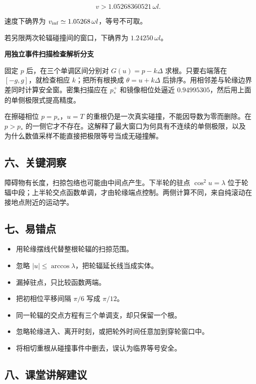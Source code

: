 \documentclass[12pt,a4paper,UTF8]{ctexart}
\newcommand{\tightlist}{\setlength{\itemsep}{0pt}\setlength{\parskip}{0pt}}
\begin{document}
\[\boxed{v>1.05268360521\,\omega l}.\]

速度下确界为 \(v_{\rm inf}\simeq1.05268\,\omega l\)，等号不可取。

若另限两次轮辐碰撞间的窗口，下确界为 \(1.24250\,\omega l\)。

\textbf{用独立事件扫描检查解析分支}

固定 \(p\) 后，在三个单调区间分别对 \(G(u)=p-k\Delta\)
求根。只要右端落在 \([-g,g]\)，就检查相应 \(k\)；把所有根换成
\(\theta=u+k\Delta\)
后排序。用相邻差与轮缘边界差同时计算安全窗。密集扫描应在 \(p_*^+\)
和镜像相位处逼近 \(0.94995305\)，然后用上面的单侧极限式提高精度。

在擦碰相位 \(p=p_*\)，\(u=T\)
的重根仍是一次真实碰撞，不能因导数为零而删除。在 \(p>p_*\)
的一侧它才不存在。这解释了最大窗口为何具有不连续的单侧极限，以及为什么数值采样不能直接把极限等号当成无碰撞解。

\subsection{六、关键洞察}\label{ux516dux5173ux952eux6d1eux5bdf}

障碍物有长度，扫掠包络也可能由中间点产生。下半轮的驻点
\(\cos^2u=\lambda\)
位于轮辐中段；上半轮交点函数单调，才由轮缘端点控制。两侧计算不同，来自纯滚动在接地点附近的运动学。

\subsection{七、易错点}\label{ux4e03ux6613ux9519ux70b9}

\begin{itemize}
\tightlist
\item
  用轮缘摆线代替整根轮辐的扫掠范围。
\item
  忽略 \(|u|\le\arccos\lambda\)，把轮辐延长线当成实体。
\item
  漏掉驻点，只比较函数两端。
\item
  把初相位平移间隔 \(\pi/6\) 写成 \(\pi/12\)。
\item
  同一轮辐的交点方程有三个单调支，却只保留一个根。
\item
  忽略轮缘进入、离开时刻，或把轮外时间任意加到穿轮窗口中。
\item
  将相切重根从碰撞事件中删去，误认为临界等号安全。
\end{itemize}

\subsection{八、课堂讲解建议}\label{ux516bux8bfeux5802ux8bb2ux89e3ux5efaux8bae}
\end{document}
